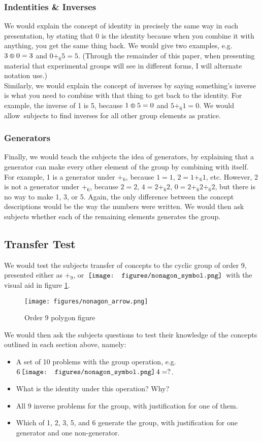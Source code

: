 \documentclass[11pt]{article}
\newcommand{\nonagon}{\,\vcenter{\hbox{\texttt{[image: figures/nonagon\_symbol.png]}}}\,}
\def\hex{\mathrel{%
    \mathchoice{\HEX}{\HEX}{\scriptsize\HEX}{\tiny\HEX}%
}}
\def\HEX{{%
    \setbox0\hbox{\varhexagon}%
    \rlap{\hbox to \wd0{\hss\raisebox{1 pt}{\scaleobj{0.6}{6}}\hss}}\box0
}}
\begin{document}
\subsubsection{Indentities \& Inverses}
We would explain the concept of identity in precisely the same way in each presentation, by stating that 0 is the identity because when you combine it with anything, you get the same thing back. We would give two examples, e.g. $3 \hex 0 = 3$ and $0 +_6 5 = 5$. (Through the remainder of this paper, when presenting material that experimental groups will see in different forms, I will alternate notation use.) \\[11pt]
Similarly, we would explain the concept of inverses by saying something's inverse is what you need to combine with that thing to get back to the identity. For example, the inverse of 1 is 5, because $1 \hex 5 = 0$ and $5 +_6 1 = 0$. We would allow\ subjects to find inverses for all other group elements as pratice. 
\subsubsection{Generators}
Finally, we would teach the subjects the idea of generators, by explaining that a generator can make every other element of the group by combining with itself. For example, 1 is a generator under $+_6$, because $1 = 1$, $2 = 1+_6 1$, etc. However, 2 is not a generator under $+_6$, because $2 = 2$, $4 = 2 +_6 2$, $0 = 2+_6 2 +_6 2$, but there is no way to make 1, 3, or 5. Again, the only difference between the concept descriptions would be the way the numbers were written. We would then ask subjects whether each of the remaining elements generates the group.
\subsection{Transfer Test}
We would test the subjects transfer of concepts to the cyclic group of order 9, presented either as $+_9$, or $\nonagon$ with the visual aid in figure \ref{nonagonex}. 
\begin{figure}[H] \centering \texttt{[image: figures/nonagon\_arrow.png]} \caption{Order 9 polygon figure} \label{nonagonex} \end{figure} \noindent
We would then ask the subjects questions to test their knowledge of the concepts outlined in each section above, namely:
\begin{itemize} 
\item A set of 10 problems with the group operation, e.g. $6 \nonagon 4 = ?$.
\item What is the identity under this operation? Why?
\item All 9 inverse problems for the group, with justification for one of them.
\item Which of 1, 2, 3, 5, and 6 generate the group, with justification for one generator and one non-generator.
\end{itemize}
\end{document}
